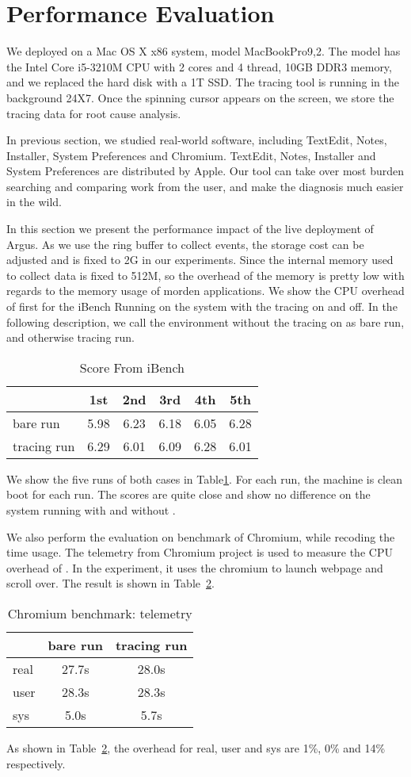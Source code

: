 \section{Performance Evaluation}
\label{sec:evaluation}
We deployed \xxx on a Mac OS X x86 system, model MacBookPro9,2.  The
model has the Intel Core i5-3210M CPU with 2 cores and 4 thread, 10GB DDR3
memory, and we replaced the hard disk with a 1T SSD. The tracing tool is
running in the background 24X7. Once the spinning cursor appears on the
screen, we store the tracing data for root cause analysis.

In previous section, we studied real-world software, including TextEdit,
Notes, Installer, System Preferences and Chromium. TextEdit, Notes, Installer and System
Preferences are distributed by Apple.  
Our tool can take over most burden searching and comparing work from the user,
and make the diagnosis much easier in the wild.

In this section we present the performance impact of the live deployment of Argus.
As we use the ring buffer to collect events, the storage cost can be adjusted
and is fixed to 2G in our experiments.
Since the internal memory used to collect data is fixed to 512M, so the overhead of the
memory is pretty low with regards to the memory usage of  morden applications.
We show the CPU overhead of \xxx first for the iBench Running on the system with the tracing
on and off. In the following description, we call the environment without the tracing on as
bare run, and otherwise tracing run.

\begin{table}[h]
\begin{tabular}{l|c|c|c|c|c}
\hline
 & 1st & 2nd & 3rd & 4th & 5th\\
\hline
 bare run & 5.98 & 6.23 & 6.18 & 6.05 & 6.28\\
\hline
 tracing run& 6.29 & 6.01 & 6.09 & 6.28 & 6.01\\
\hline
\end{tabular}
\caption{Score From iBench}
\label{tab:ibench}
\end{table}
We show the five runs of both cases in Table\ref{tab:ibench}.
For each run, the machine is clean boot for each run.
The scores are quite close and show no difference on the system running with and without \xxx.

We also perform the evaluation on benchmark of Chromium, while recoding the time usage.
The telemetry from Chromium project is used to measure the CPU overhead of \xxx.
In the experiment, it uses the chromium to launch webpage and scroll over.
The result is shown in Table~\ref{tab:chromium benchmark}. 
\begin{table}[h]
\begin{tabular}{l|c|c}
\hline
 & bare run & tracing run \\
\hline
real & 27.7s & 28.0s \\
\hline
user & 28.3s & 28.3s \\
\hline
sys &  5.0s & 5.7s\\
\hline
\end{tabular}
\caption{Chromium benchmark: telemetry}
\label{tab:chromium benchmark}
\end{table}

As shown in Table~\ref{tab:chromium benchmark}, the overhead for real, user and sys are 1\%, 0\% and
14\% respectively.
